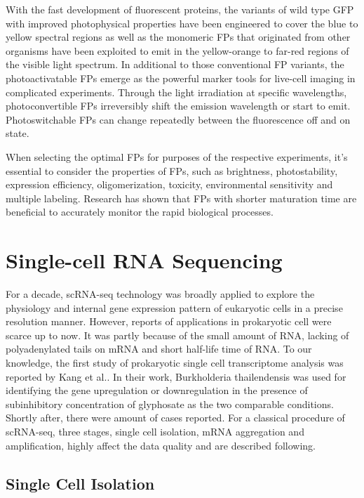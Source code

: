 \documentclass[fleqn,10pt]{wlscirep}
\begin{document}
With the fast development of fluorescent proteins, the variants of wild type GFP with improved photophysical properties have been engineered to cover the blue to yellow spectral regions as well as the monomeric FPs that originated from other organisms have been exploited to emit in the yellow-orange to far-red regions of the visible light spectrum\cite{Day2009}. In additional to those conventional FP variants, the photoactivatable FPs emerge as the powerful marker tools for live-cell imaging in complicated experiments. Through the light irradiation at specific wavelengths, photoconvertible FPs irreversibly shift the emission wavelength or start to emit. Photoswitchable FPs can change repeatedly between the fluorescence off and on state\cite{Nienhaus2014}. 

When selecting the optimal FPs for purposes of the respective experiments, it’s essential to consider the properties of FPs, such as brightness, photostability, expression efficiency, oligomerization, toxicity, environmental sensitivity and multiple labeling\cite{Shaner2005}. Research has shown that FPs with shorter maturation time are beneficial to accurately monitor the rapid biological processes\cite{Balleza2018}.

\section[]{Single-cell RNA Sequencing}

For a decade, scRNA-seq technology was broadly applied to explore the physiology and internal gene expression pattern of eukaryotic cells in a precise resolution manner. However, reports of applications in prokaryotic cell were scarce up to now. It was partly because of the small amount of RNA, lacking of polyadenylated tails on mRNA and short half-life time of RNA\cite{Zhang2018}. To our knowledge, the first study of prokaryotic single cell transcriptome analysis was reported by Kang et al.\cite{Kang2011,Kang2015}. In their work, Burkholderia thailendensis was used for identifying the gene upregulation or downregulation in the presence of subinhibitory concentration of glyphosate as the two comparable conditions. Shortly after, there were amount of cases reported. For a classical procedure of scRNA-seq, three stages, single cell isolation, mRNA aggregation and amplification, highly affect the data quality and are described following.

\subsection[]{Single Cell Isolation}
\end{document}
